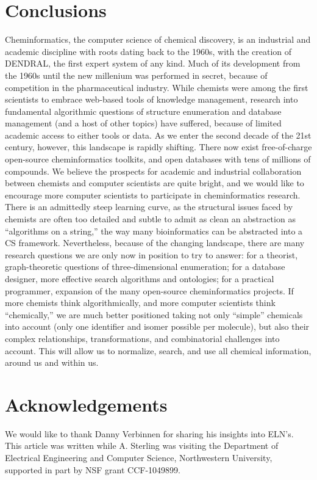 \documentclass{sig-alternate}
\begin{document}
\section{Conclusions}
\label{sec:conclusions}
Cheminformatics, the computer science of chemical discovery, is an
industrial and academic discipline with roots dating back to the
1960s, with the creation of DENDRAL, the first expert system of any
kind.  Much of its development from the 1960s until the new millenium
was performed in secret, because of competition in the pharmaceutical
industry.  While chemists were among the first scientists to embrace
web-based tools of knowledge management, research into fundamental
algorithmic questions of structure enumeration and database management
(and a host of other topics) have suffered, because of limited
academic access to either tools or data.  As we enter the second
decade of the 21st century, however, this landscape is rapidly
shifting.  There now exist free-of-charge open-source cheminformatics
toolkits, and open databases with tens of millions of compounds.  We
believe the prospects for academic and industrial collaboration
between chemists and computer scientists are quite bright, and we
would like to encourage more computer scientists to participate in
cheminformatics research.  There is an admittedly steep learning
curve, as the structural issues faced by chemists are often too
detailed and subtle to admit as clean an abstraction as ``algorithms
on a string,'' the way many bioinformatics can be abstracted into a CS
framework.  Nevertheless, because of the changing landscape, there are
many research questions we are only now in position to try to answer:
for a theorist, graph-theoretic questions of three-dimensional
enumeration; for a database designer, more effective search algorithms
and ontologies; for a practical programmer, expansion of the many
open-source cheminformatics projects.  If more chemists think
algorithmically, and more computer scientists think ``chemically,''
we are much better positioned taking not only ``simple'' chemicals
into account (only one identifier and isomer possible per molecule),
but also their complex relationships, transformations, and
combinatorial challenges into account. This will allow us to
normalize, search, and use all chemical information, around us and
within us.

\section*{Acknowledgements}
We would like to thank Danny Verbinnen for sharing his insights into
ELN's.  This article was written while A. Sterling was visiting the
Department of Electrical Engineering and Computer Science,
Northwestern University, supported in part by NSF grant CCF-1049899.



\end{document}
